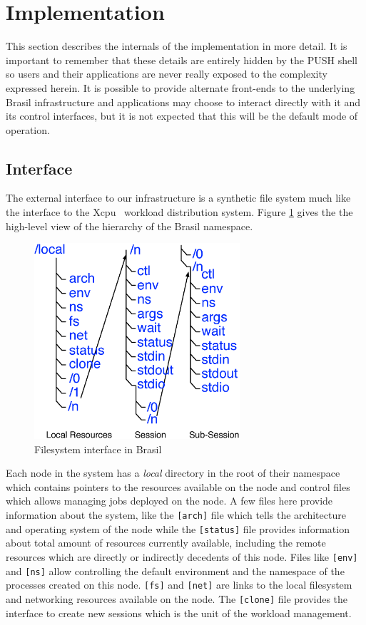 \section{Implementation}

This section describes the internals of the implementation in more
detail.  It is important to remember that these details are entirely
hidden by the PUSH shell so users and their applications are never
really exposed to the complexity expressed herein.  It is possible
to provide alternate front-ends to the underlying Brasil infrastructure
and applications may choose to interact directly with it and its control
interfaces, but it is not expected that this will be the default mode of 
operation.

\subsection{Interface}

The external interface to our infrastructure is a synthetic file system
much like the interface to the Xcpu~\cite{lucho-xcpu} workload distribution
system.  
Figure \ref{fig:xcpu3Local} gives the the high-level view of the hierarchy 
of the Brasil namespace.


\begin{figure}[htp]
\centering
\includegraphics[width=3in]{./img/taskfs-hierarchy.eps}
\caption{Filesystem interface in Brasil}
\label{fig:xcpu3Local}
\end{figure}

Each node in the system has a \emph{local} directory in the root of their
namespace which contains pointers to the resources
available on the node and control files which allows managing 
jobs deployed on the node.
A few files here provide information about the system, like the
\texttt{[arch]} file which tells the architecture and operating system of 
the node while the \texttt{[status]} file provides information about total 
amount of resources currently available, including the remote resources which 
are directly or indirectly decedents of this node.  
Files like \texttt{[env]} and \texttt{[ns]}
allow controlling the default environment and the namespace of the processes
created on this node.  \texttt{[fs]} and \texttt{[net]} are links to the local
filesystem and networking resources available on the node.  The
\texttt{[clone]} file provides the interface to create new sessions which is
the unit of the workload management.

